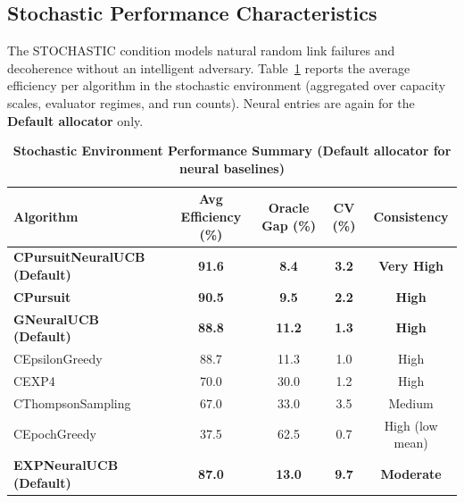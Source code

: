 \documentclass[12pt,a4paper]{article}
\newcommand{\stochastic}[1]{\textcolor{stochasticcolor}{\textbf{#1}}}
\newcommand{\legacy}[1]{\textcolor{legacycolor}{\textbf{#1}}}
\newcommand{\neural}[1]{\textcolor{neuralcolor}{\textbf{#1}}}
\begin{document}
\begin{tcolorbox}[colback=stochasticcolor!10,colframe=stochasticcolor,title=\textbf{Stochastic Environment Deep Analysis (1$\times$–2$\times$ Capacities, T/Tb Combined)}]

\subsection{Stochastic Performance Characteristics}

The STOCHASTIC condition models natural random link failures and decoherence without an intelligent adversary. Table~\ref{tab:stoch-performance} reports the average efficiency per algorithm in the stochastic environment (aggregated over capacity scales, evaluator regimes, and run counts). Neural entries are again for the \textbf{Default allocator} only.

\begin{table}[H]
\small
\centering
\caption{\stochastic{Stochastic Environment Performance Summary (Default allocator for neural baselines)}}
\label{tab:stoch-performance}
\begin{tabular}{|l|c|c|c|c|}
\hline
\textbf{Algorithm} & \textbf{Avg Efficiency (\%)} & \textbf{Oracle Gap (\%)} & \textbf{CV (\%)} & \textbf{Consistency} \\
\hline
\hline
\neural{CPursuitNeuralUCB (Default)}   & \neural{\textbf{91.6}} & \neural{8.4}      & \neural{3.2}     & \neural{Very High} \\
\stochastic{CPursuit}                  & \stochastic{\textbf{90.5}} & \stochastic{9.5}  & \stochastic{2.2} & \stochastic{High} \\
\neural{GNeuralUCB (Default)}          & \neural{\textbf{88.8}} & \neural{11.2}     & \neural{1.3}     & \neural{High} \\
CEpsilonGreedy                         & 88.7                        & 11.3              & 1.0              & High \\
CEXP4                                  & 70.0                        & 30.0              & 1.2              & High \\
CThompsonSampling                      & 67.0                        & 33.0              & 3.5              & Medium \\
CEpochGreedy                           & 37.5                        & 62.5              & 0.7              & High (low mean) \\
\legacy{EXPNeuralUCB (Default)}        & \legacy{87.0}               & \legacy{13.0}     & \legacy{9.7}     & \legacy{Moderate} \\
\hline
\end{tabular}
\end{table}


\end{tcolorbox}
\end{document}
